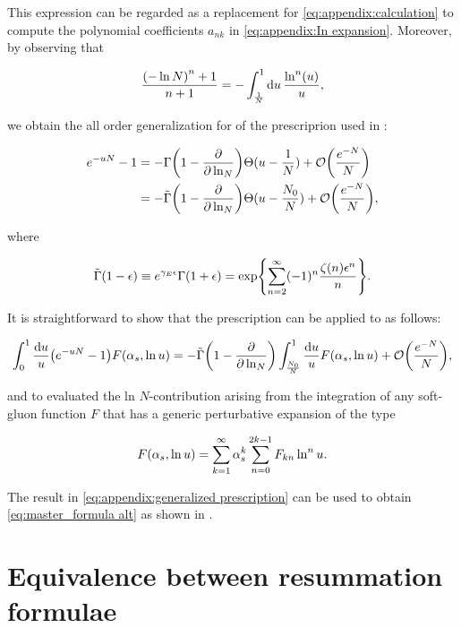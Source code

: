 \documentclass[../Tesi_Jiahao_Miao_986136.tex]{subfiles}
\begin{document}
This expression can be regarded as a replacement for \cref{eq:appendix:calculation} to compute the polynomial coefficients $a_{nk}$ 
in \cref{eq:appendix:In expansion}. Moreover, by observing that 

\begin{equation}
    \frac{ \qty(-\ln N)^n+1}{n+1} = -\int_{\frac{1}{N}}^1 \dd{u} \frac{\ln^n(u)}{u},
\end{equation}

we obtain the all order generalization for of the prescriprion used in \cite{CATANI19933}:

\begin{align}
    e^{-uN}-1 &= -\Gamma\qty(1-\pdv{\ln_N}) \Theta(u-\frac{1}{N}) + \order{\frac{e^{-N}}{N}}\\
              &=  -\tilde{\Gamma}\qty(1-\pdv{\ln_N}) \Theta(u-\frac{N_0}{N}) + \order{\frac{e^{-N}}{N}},
\end{align}

where 

\begin{equation}\label{eq:appendix:gamma tilde}
    \tilde{\Gamma}\qty(1-\epsilon) \equiv e^{\gamma_E \epsilon} \Gamma(1+\epsilon) = \exp{\sum_{n=2}^\infty (-1)^n \frac{ \zeta(n) \epsilon^n}{n}}.
\end{equation}

It is straightforward to show that the prescription can be applied to as follows:

\begin{equation} \label{eq:appendix:generalized prescription}
    \int_0^1 \frac{\dd{u}}{u} \qty(e^{-u N} - 1) F\qty(\alpha_s , \ln u) = -\tilde{\Gamma}\qty(1-\pdv{\ln_N}) \int_{\frac{N_0}{N}}^1 \frac{\dd{u}}{u} F\qty(\alpha_s , \ln u) + \order{\frac{e^{-N}}{N}},
\end{equation}
    
and to evaluated the ln $N$-contribution arising from the integration of any soft-gluon function $F$ that has a generic perturbative expansion of the type

\begin{equation}
    F\qty(\alpha_s , \ln u) = \sum_{k=1}^\infty \alpha_s^k \sum_{n=0}^{2k-1} F_{kn}\ln^n u .
\end{equation}

The result in \cref{eq:appendix:generalized prescription} can be used to obtain \cref{eq:master_formula alt} as shown in \cite{Catani_2003_appendix}.

\chapter{Equivalence between resummation formulae} \label{Appendix: Coefficients}
\end{document}
